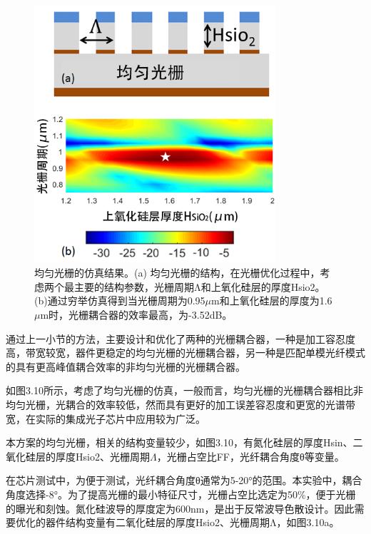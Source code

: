 \begin{figure}[!htbp]
    \centering
    \includegraphics[width=0.8\textwidth]{Img/3-10.png}
    \caption{均匀光栅的仿真结果。(a) 均匀光栅的结构，在光栅优化过程中，考虑两个最主要的结构参数，光栅周期Λ和上氧化硅层的厚度Hsio2。(b)通过穷举仿真得到当光栅周期为0.95$\mu$m和上氧化硅层的厚度为1.6$\mu$m时，光栅耦合器的效率最高，为-3.52dB。}
    \label{fig:3-10}
\end{figure}

通过上一小节的方法，主要设计和优化了两种的光栅耦合器，一种是加工容忍度高，带宽较宽，器件更稳定的均匀光栅的光栅耦合器，另一种是匹配单模光纤模式的具有更高峰值耦合效率的非均匀光栅的光栅耦合器。

如图3.10所示，考虑了均匀光栅的仿真，一般而言，均匀光栅的光栅耦合器相比非均匀光栅，光耦合的效率较低，然而具有更好的加工误差容忍度和更宽的光谱带宽，在实际的集成光子芯片中应用较为广泛。

本方案的均匀光栅，相关的结构变量较少，如图3.10，有氮化硅层的厚度Hsin、二氧化硅层的厚度Hsio2、光栅周期$\Lambda$，光栅占空比FF，光纤耦合角度θ等变量。

在芯片测试中，为便于测试，光纤耦合角度θ通常为5-20°的范围。本实验中，耦合角度选择-8°。为了提高光栅的最小特征尺寸，光栅占空比选定为50\%，便于光栅的曝光和刻蚀。氮化硅波导的厚度定为600nm，是出于反常波导色散设计。因此需要优化的器件结构变量有二氧化硅层的厚度Hsio2、光栅周期Λ，如图3.10a。

